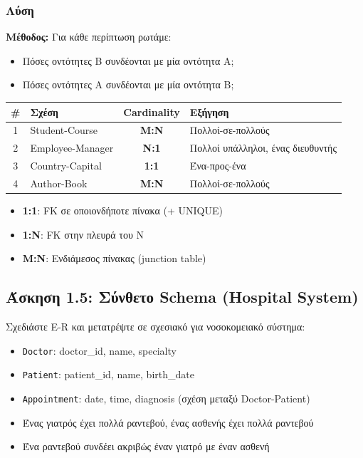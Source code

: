 \subsubsection*{Λύση}

\textbf{Μέθοδος:} Για κάθε περίπτωση ρωτάμε:
\begin{itemize}
    \item Πόσες οντότητες Β συνδέονται με μία οντότητα Α;
    \item Πόσες οντότητες Α συνδέονται με μία οντότητα Β;
\end{itemize}

\begin{center}
\begin{tabular}{clcl}
\toprule
\textbf{\#} & \textbf{Σχέση} & \textbf{Cardinality} & \textbf{Εξήγηση} \\
\midrule
1 & Student-Course & \textbf{M:N} & Πολλοί-σε-πολλούς \\
2 & Employee-Manager & \textbf{N:1} & Πολλοί υπάλληλοι, ένας διευθυντής \\
3 & Country-Capital & \textbf{1:1} & Ένα-προς-ένα \\
4 & Author-Book & \textbf{M:N} & Πολλοί-σε-πολλούς \\
\bottomrule
\end{tabular}
\end{center}

\begin{infobox}
\begin{itemize}
    \item \textbf{1:1}: FK σε οποιονδήποτε πίνακα (+ UNIQUE)
    \item \textbf{1:N}: FK στην πλευρά του N
    \item \textbf{M:N}: Ενδιάμεσος πίνακας (junction table)
\end{itemize}
\end{infobox}

\subsection{Άσκηση 1.5: Σύνθετο Schema (Hospital System)}

\begin{formulabox}[Εκφώνηση]
Σχεδιάστε E-R και μετατρέψτε σε σχεσιακό για νοσοκομειακό σύστημα:
\begin{itemize}
    \item \texttt{Doctor}: doctor\_id, name, specialty
    \item \texttt{Patient}: patient\_id, name, birth\_date
    \item \texttt{Appointment}: date, time, diagnosis (σχέση μεταξύ Doctor-Patient)
    \item Ένας γιατρός έχει πολλά ραντεβού, ένας ασθενής έχει πολλά ραντεβού
    \item Ένα ραντεβού συνδέει ακριβώς έναν γιατρό με έναν ασθενή
\end{itemize}
\end{formulabox}


